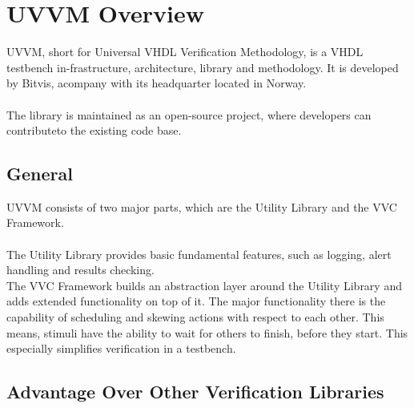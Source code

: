 \section{UVVM Overview}

UVVM, short for Universal VHDL Verification Methodology, is a VHDL testbench in-frastructure, architecture, library and methodology. It is developed by Bitvis, acompany with its headquarter located in Norway.\\
\\
The library is maintained as an open-source project, where developers can contributeto the existing code base.

\subsection{General}

UVVM consists of two major parts, which are the Utility Library and the VVC Framework.\\
\\
The Utility Library provides basic fundamental features, such as logging, alert handling and results checking.\\
The VVC Framework builds an abstraction layer around the Utility Library and adds extended functionality on top of it. The major functionality there is the capability of scheduling and skewing actions with respect to each other. This means, stimuli have the ability to wait for others to finish, before they start. This especially simplifies verification in a testbench.

\subsection{Advantage Over Other Verification Libraries}


